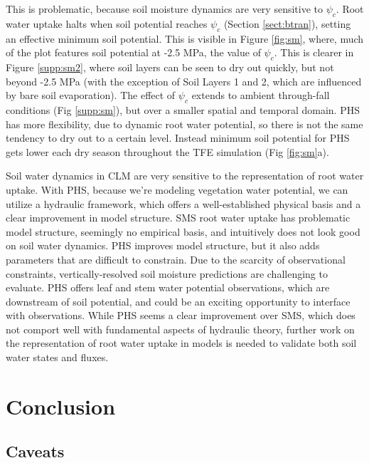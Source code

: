 \documentclass[draft,linenumbers]{agujournal}
\begin{document}
    This is problematic, because soil moisture dynamics are very sensitive to $\psi_c$.
    Root water uptake halts when soil potential reaches $\psi_c$ (Section \ref{sect:btran}), setting an effective minimum soil potential.
    This is visible in Figure \ref{fig:sm}, where, much of the plot features soil potential at -2.5 MPa, the value of $\psi_c$.
    This is clearer in Figure \ref{supp:sm2}, where soil layers can be seen to dry out quickly, but not beyond -2.5 MPa 
    (with the exception of Soil Layers 1 and 2, which are influenced by bare soil evaporation).
    The effect of $\psi_c$ extends to ambient through-fall conditions (Fig \ref{supp:sm}), but over a smaller spatial and temporal domain.
    PHS has more flexibility, due to dynamic root water potential, so there is not the same tendency to dry out to a certain level.
    Instead minimum soil potential for PHS gets lower each dry season throughout the TFE simulation (Fig \ref{fig:sm}a).
    
    Soil water dynamics in CLM are very sensitive to the representation of root water uptake.
    With PHS, because we're modeling vegetation water potential, we can utilize a hydraulic framework, 
    which offers a well-established physical basis and a clear improvement in model structure.
    SMS root water uptake has problematic model structure, seemingly no empirical basis, and intuitively does not look good on soil water dynamics.
    PHS improves model structure, but it also adds parameters that are difficult to constrain. 
    Due to the scarcity of observational constraints, vertically-resolved soil moisture predictions are challenging to evaluate.
    PHS offers leaf and stem water potential observations, which are downstream of soil potential, and could be an exciting opportunity to interface with observations. 
    While PHS seems a clear improvement over SMS, which does not comport well with fundamental aspects of hydraulic theory, further work on the representation of root water uptake in models is needed to validate both soil water states and fluxes.
    


\section{Conclusion}

\subsection{Caveats}
\end{document}
